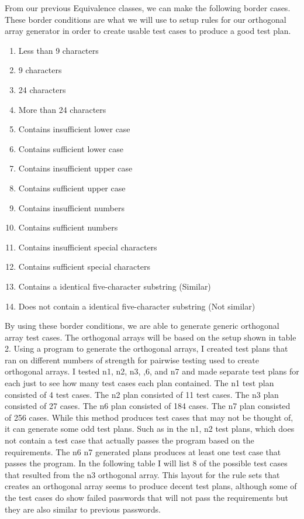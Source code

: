 \documentclass[12pt,letterpaper]{article}
\begin{document}
From our previous Equivalence classes, we can make the following border cases. These border conditions
are what we will use to setup rules for our orthogonal array generator in order to create usable test
cases to produce a good test plan.

\begin{enumerate}
\item Less than 9 characters
\item 9 characters
\item 24 characters
\item More than 24 characters
\item Contains insufficient lower case
\item Contains sufficient lower case
\item Contains insufficient upper case
\item Contains sufficient upper case
\item Contains insufficient numbers
\item Contains sufficient numbers
\item Contains insufficient special characters
\item Contains sufficient special characters
\item Contains a identical five-character substring (Similar)
\item Does not contain a identical five-character substring (Not similar)
\end{enumerate}

By using these border conditions, we are able to generate generic orthogonal array test cases.  The orthogonal arrays will be based on the setup
shown in table 2. Using a program to generate the orthogonal arrays, I created test plans that ran on different numbers of
strength for pairwise testing used to create orthogonal arrays. I tested n1, n2, n3, ,6, and n7 and made separate test plans for each
just to see how many test cases each plan contained. The n1 test plan consisted of 4 test cases. The n2 plan consisted of 11 test cases.
The n3 plan consisted of 27 cases. The n6 plan consisted of 184 cases. The n7 plan consisted of 256 cases. While this method produces
test cases that may not be thought of, it can generate some odd test plans. Such as in the n1, n2 test plans, which does not
contain a test case that actually passes the program based on the requirements. The n6 n7 generated plans produces at least one
test case that passes the program. In the following table I will list 8 of the possible test cases that resulted from the n3 orthogonal array.
This layout for the rule sets that creates an orthogonal array seems to produce decent test plans, although some of the test cases
do show failed passwords that will not pass the requirements but they are also similar to previous passwords.
\end{document}
